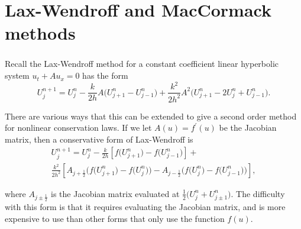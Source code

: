 \section{Lax-Wendroff and MacCormack methods}

\begin{frame}
  \frametitle{\secname}

  Recall the Lax-Wendroff method for a constant coefficient linear
  hyperbolic system
  \begin{math}
    u_{t}+
    Au_{x}=
    0
  \end{math}
  has the form
  \begin{equation}\tag{12.24}\label{eq:12.24}
    U^{n+1}_{j}=
    U_{j}^{n}-
    \frac{k}{2h}
    A
    \big(
    U^{n}_{j+1}-
    U^{n}_{j-1}
    \big)+
    \frac{k^{2}}{2h^{2}}
    A^{2}
    \big(
    U^{n}_{j+1}-
    2U^{n}_{j}+
    U^{n}_{j-1}
    \big).
  \end{equation}

  There are various ways that this can be extended to give a second
  order method for nonlinear conservation laws.
  If we let
  \begin{math}
    A\left(u\right)=
    f^{\prime}
    \left(u\right)
  \end{math}
  be the Jacobian matrix, then a conservative form of Lax-Wendroff is
  \begin{equation}\tag{12.25}\label{eq:12.25}
    \begin{split}
      U^{n+1}_{j}=
      U^{n}_{j}-
      \frac{k}{2h}
      \left[
        f
        \big(U^{n}_{j+1}\big)-
        f
        \big(U^{n}_{j-1}\big)
      \right]+ \\
      \frac{k^{2}}{2h^{2}}
      \left[
        A_{j+\frac{1}{2}}
        \big(
        f
        \big(U^{n}_{j+1}\big)-
        f
        \big(U^{n}_{j}\big)
        \big)-
        A_{j-\frac{1}{2}}
        \big(
        f
        \big(U^{n}_{j}\big)-
        f
        \big(U^{n}_{j-1}\big)
        \big)
        \right],
    \end{split}
  \end{equation}

  where $A_{j\pm\frac{1}{2}}$ is the Jacobian matrix evaluated at
  \begin{math}
    \frac{1}{2}
    \big(
    U_{j}^{n}+
    U_{j\pm 1}^{n}
    \big)
  \end{math}.
  The difficulty with this form is that it requires evaluating the
  Jacobian matrix, and is more expensive to use than other forms that
  only use the function $f\left(u\right)$.


\end{frame}
